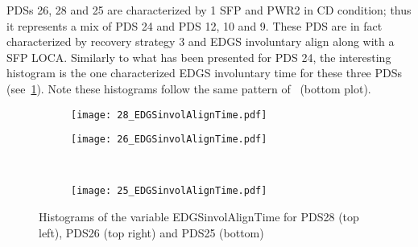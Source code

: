 PDSs 26, 28 and 25 are characterized by 1 SFP and PWR2 in CD condition; thus it represents a mix of PDS 24 and PDS 12, 10 and 9.
These PDS are in fact characterized by recovery strategy 3 and EDGS involuntary align along with a SFP LOCA.
Similarly to what has been presented for PDS 24, the interesting histogram is the one characterized EDGS involuntary time for 
these three PDSs (see~\ref{fig:histPDS_26_28_25_EDGSinvolAlignTime}). Note these histograms follow the same pattern 
of~\label{fig:histPDS_24} (bottom plot).

\begin{figure}
  \begin{subfigure}{.5\linewidth}
    \centering
    \texttt{[image: 28\_EDGSinvolAlignTime.pdf]}
  \end{subfigure}%
  \begin{subfigure}{.5\linewidth}
    \centering
    \texttt{[image: 26\_EDGSinvolAlignTime.pdf]}
  \end{subfigure}\\[1ex]
  \begin{subfigure}{\linewidth}
    \centering
    \texttt{[image: 25\_EDGSinvolAlignTime.pdf]}
  \end{subfigure}
  \caption{Histograms of the variable EDGSinvolAlignTime for PDS28 (top left), PDS26 (top right) and PDS25 (bottom)}
  \label{fig:histPDS_26_28_25_EDGSinvolAlignTime}
\end{figure}

